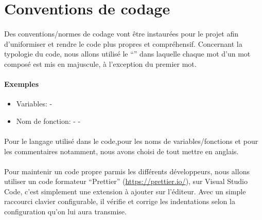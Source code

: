 \documentclass[../main.tex]{subfiles}
\begin{document}
    \section{Conventions de codage}

    \paragraph{}
    Des conventions/normes de codage vont être instaurées pour le projet afin d'uniformiser et rendre le code plus propres et compréhensif. Concernant la typologie du code, nous allons utilisé le “” dans laquelle chaque mot d'un mot composé est mis en majuscule, à l'exception du premier mot.

    \paragraph{Exemples}
    \begin{itemize}
        \item Variables:  - 
        \item Nom de fonction:  -  -  
    \end{itemize}

    \paragraph{}
    Pour le langage utilisé dans le code,pour les noms de variables/fonctions et pour les commentaires notamment, nous avons choisi de tout mettre en anglais.

    \paragraph{}
    Pour maintenir un code propre parmis les différents développeurs, nous allons utiliser un code formateur “Prettier” (\url{https://prettier.io/}), sur Visual Studio Code, c’est simplement une extension à ajouter sur l'éditeur. Avec un simple raccourci clavier configurable, il vérifie et corrige les indentations selon la configuration qu’on lui aura transmise.
\end{document}
